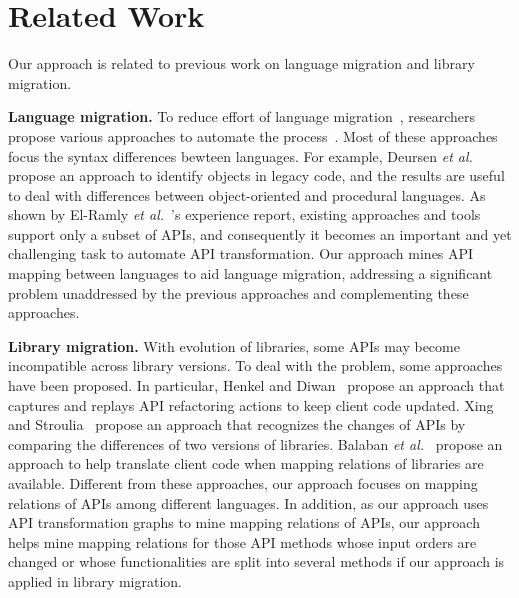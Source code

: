 \section{Related Work}
\label{sec:related} Our approach is related to previous work on
language migration and library migration.

\textbf{Language migration.} To reduce effort of language
migration~\cite{samet1981experience}, researchers propose various
approaches to automate the
process~\cite{van1999identifying,waters1988program,mossienko2003automated,yasumatsu1995spice,hainaut2008migration}.
Most of these approaches focus the syntax differences bewteen
languages. For example, Deursen \emph{et
al.}~\cite{van1999identifying} propose an approach to identify
objects in legacy code, and the results are useful to deal with
differences between object-oriented and procedural languages. As
shown by El-Ramly \emph{et al.}~\cite{el2006experiment}'s experience
report, existing approaches and tools support only a subset of APIs,
and consequently it becomes an important and yet challenging task to
automate API transformation. Our approach mines API mapping between
languages to aid language migration, addressing a significant
problem unaddressed by the previous approaches and complementing
these approaches.

\textbf{Library migration.} With evolution of libraries, some APIs
may become incompatible across library versions. To deal with the
problem, some approaches have been proposed. In particular, Henkel
and Diwan~\cite{henkel2005catchup} propose an approach that captures
and replays API refactoring actions to keep client code updated.
Xing and Stroulia~\cite{xing2007api} propose an approach that
recognizes the changes of APIs by comparing the differences of two
versions of libraries. Balaban \emph{et
al.}~\cite{balaban2005refactoring} propose an approach to help
translate client code when mapping relations of libraries are
available. Different from these approaches, our approach focuses on
mapping relations of APIs among different languages. In addition, as
our approach uses API transformation graphs to mine mapping
relations of APIs, our approach helps mine mapping relations for
those API methods whose input orders are changed or whose
functionalities are split into several methods if our approach is
applied in library migration.

